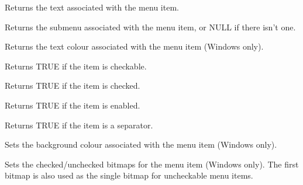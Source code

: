 Returns the text associated with the menu item.

\label{wxmenuitemgetsubmenu}


Returns the submenu associated with the menu item, or NULL if there isn't one.

\label{wxmenuitemgettextcolour}


Returns the text colour associated with the menu item (Windows only).

\label{wxmenuitemischeckable}


Returns TRUE if the item is checkable.

\label{wxmenuitemischecked}


Returns TRUE if the item is checked.

\label{wxmenuitemisenabled}


Returns TRUE if the item is enabled.

\label{wxmenuitemisseparator}


Returns TRUE if the item is a separator.

\label{wxmenuitemsetbackgroundcolour}


Sets the background colour associated with the menu item (Windows only).

\label{wxmenuitemsetbitmaps}


Sets the checked/unchecked bitmaps for the menu item (Windows only). The first bitmap
is also used as the single bitmap for uncheckable menu items.

\label{wxmenuitemsetfont}

